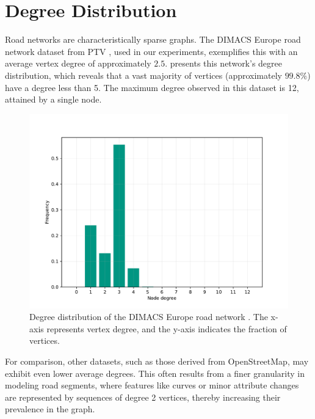 \section{Degree Distribution}
\label{sec:degree_distribution}

Road networks are characteristically sparse graphs.
The DIMACS Europe road network dataset from PTV \cite{ptv_group_dimacs-europe_2009}, used in our experiments, exemplifies this with an average vertex degree of approximately \(2.5\).
 presents this network's degree distribution, which reveals that a vast majority of vertices (approximately \(99.8\%\)) have a degree less than 5.
The maximum degree observed in this dataset is 12, attained by a single node.

\begin{figure}[tbhp]
	\centering
	\includegraphics[width=0.6\linewidth]{graphics/degree_overview_europe.pdf}
	\caption{Degree distribution of the DIMACS Europe road network \cite{ptv_group_dimacs-europe_2009}. The x-axis represents vertex degree, and the y-axis indicates the fraction of vertices.}
	\label{fig:degree_dist_europe}
\end{figure}

For comparison, other datasets, such as those derived from OpenStreetMap, may exhibit even lower average degrees.
This often results from a finer granularity in modeling road segments, where features like curves or minor attribute changes are represented by sequences of degree 2 vertices, thereby increasing their prevalence in the graph.

